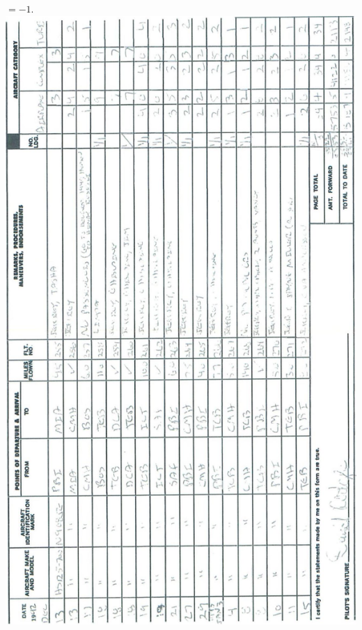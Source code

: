 \documentclass[10pt]{article}
\begin{document}
\(=-1\).\\
\includegraphics[max width=\textwidth, center]{2025_02_27_dd68c3d38de88f0516d9g-020}\\
\end{document}
